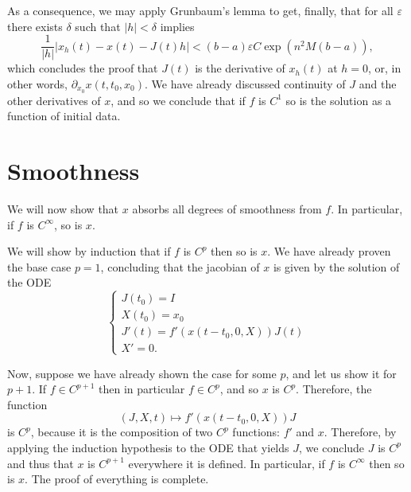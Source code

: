 \documentclass{article}
\begin{document}
As a consequence, we may apply Grunbaum's lemma to get, finally, that for all $\varepsilon$ there exists $\delta$ such that $\lvert h \rvert < \delta$ implies
\[ \frac1{\lvert h \rvert} \lvert x_h(t) - x(t) - J(t) h \rvert < (b-a)\varepsilon C \exp(n^2 M (b-a)),\]
which concludes the proof that $J(t)$ is the derivative of $x_h(t)$ at $h=0$, or, in other words, $\partial_{x_0} x(t,t_0,x_0)$. We have already discussed continuity of $J$ and the other derivatives of $x$, and so we conclude that if $f$ is $C^1$ so is the solution as a function of initial data.

\section{Smoothness}

We will now show that $x$ absorbs all degrees of smoothness from $f$. In particular, if $f$ is $C^\infty$, so is $x$.

We will show by induction that if $f$ is $C^p$ then so is $x$. We have already proven the base case $p = 1$, concluding that the jacobian of $x$ is given by the solution of the ODE
\[
\begin{cases}
J(t_0) = I\\
X(t_0) = x_0\\
J'(t) = f'(x(t-t_0,0,X)) J(t)\\
X' = 0.
\end{cases}
\]

Now, suppose we have already shown the case for some $p$, and let us show it for $p+1$. If $f \in C^{p+1}$ then in particular $f \in C^p$, and so $x$ is $C^p$. Therefore, the function
\[(J,X,t) \mapsto f'(x(t-t_0,0,X)) J\]
is $C^p$, because it is the composition of two $C^p$ functions: $f'$ and $x$. Therefore, by applying the induction hypothesis to the ODE that yields $J$, we conclude $J$ is $C^p$ and thus that $x$ is $C^{p+1}$ everywhere it is defined. In particular, if $f$ is $C^\infty$ then so is $x$. The proof of everything is complete.
\end{document}
